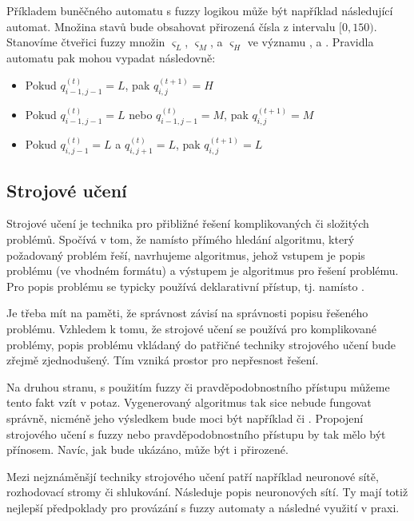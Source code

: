 \documentclass[a4paper,10pt]{article}
\begin{document}
\begin{example}
 Příkladem buněčného automatu s fuzzy logikou může být například následující automat. Množina stavů bude obsahovat přirozená čísla z intervalu $[0, 150)$. Stanovíme čtveřici fuzzy množin $\varsigma_L$, $\varsigma_M$, a $\varsigma_H$ ve významu ,  a . Pravidla automatu pak mohou vypadat následovně:
 \begin{itemize}
  \item Pokud $q^{(t)}_{i-1,j-1} = L$, pak $q^{(t+1)}_{i,j} = H$
  \item Pokud $q^{(t)}_{i-1,j-1} = L$ nebo $q^{(t)}_{i-1,j-1} = M$, pak $q^{(t+1)}_{i,j} = M$
  \item Pokud $q^{(t)}_{i,j-1} = L$ a $q^{(t)}_{i,j+1} = L$, pak $q^{(t+1)}_{i,j} = L$
 \end{itemize}
\end{example}

\subsection{Strojové učení}

Strojové učení je technika pro přibližné řešení komplikovaných či složitých problémů. Spočívá v tom, že namísto přímého hledání algoritmu, který požadovaný problém řeší, navrhujeme algoritmus, jehož vstupem je popis problému (ve vhodném formátu) a výstupem je algoritmus pro řešení problému. Pro popis problému se typicky používá deklarativní přístup, tj.  namísto .

Je třeba mít na paměti, že správnost  závisí na správnosti popisu řešeného problému. Vzhledem k tomu, že strojové učení se používá pro komplikované problémy, popis problému vkládaný do patřičné techniky strojového učení bude zřejmě zjednodušený. Tím vzniká prostor pro nepřesnost řešení.

Na druhou stranu, s použitím fuzzy či pravděpodobnostního přístupu můžeme tento fakt vzít v potaz. Vygenerovaný algoritmus tak sice nebude fungovat správně, nicméně jeho výsledkem bude moci být například  či . Propojení strojového učení s fuzzy nebo pravděpodobnostního přístupu by tak mělo být přínosem. Navíc, jak bude ukázáno, může být i přirozené.

Mezi nejznáměnšjí techniky strojového učení patří například neuronové sítě, rozhodovací stromy či shlukování. Následuje popis neuronových sítí. Ty mají totiž nejlepší předpoklady pro provázání s fuzzy automaty a následné využití v praxi.
\end{document}
